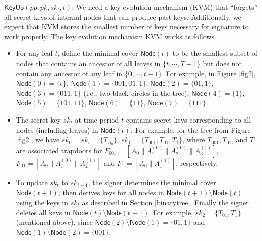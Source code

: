 \documentclass[runningheads]{llncs}
\begin{document}
\begin{description}
\item  \underline{$ \textsf{KeyUp}(pp,pk,sk_t,t)$}: 
	We need a key evolution mechanism (\textsf{KVM}) that ``forgets'' all secret keys 
	of internal nodes that can produce past keys.
	Additionally, we expect that \textsf{KVM} stores the smallest number of keys necessary for signature to work properly.
	The key evolution mechanism \textsf{KVM} works as follows.
   	\begin{itemize}
  	 \item 
   	For any leaf $t$, define the minimal cover $\textsf{Node}(t)$ to be 
	the smallest subset of nodes that contains an ancestor of all leaves in $\{t, \cdots , T-1\}$ but does not contain any
   	ancestor of any leaf in $\{0, \cdots , t-1\}$.   
   	For example, in Figure \ref{fig2}, $\textsf{Node}(0)=\{\epsilon\}$, $\textsf{Node}(1)=\{001, 01, 1\}$, 
	$\textsf{Node}(2)=\{01, 1\}$, $\textsf{Node}(3)=\{011, 1\}$ (i.e., two black circles in the tree), $\textsf{Node}(4)=\{1\}$,  
	$\textsf{Node}(5)=\{101, 11\}$, $\textsf{Node}(6)=\{ 11\}$, $\textsf{Node}(7)=\{111\}$.
	\item The secret key $sk_t$ at time period $t$ contains secret keys corresponding to all nodes 
	(including leaves) in  $\textsf{Node}(t)$. 
	For example, for the tree from Figure \ref{fig2},
	we have 
	$sk_0=sk_{\epsilon}=\{T_{A_0}\}$, $sk_1=\{T_{001}, T_{01}, T_{1} \}$, 
	where $T_{001}, T_{01}$, and $T_{1}$ are associated trapdoors for 
	$F_{001}=[A_0\|A_1^{(0)}\|A_{2}^{(0)}\|A_3^{(1)}]$, $F_{01}=[A_0\|A_1^{(0)}\|A_{2}^{(1)}]$ and $F_{1}=[A_0\|A_1^{(1)}]$, respectively.
	\item 
	To update $sk_t$ to $sk_{t+1}$, the signer determines the minimal cover $\textsf{Node}(t+1)$, 
	then derives keys for all nodes in $\textsf{Node}(t+1) \setminus \textsf{Node}(t)$ using the keys in $sk_t$ 
	as described in Section \ref{binarytree}.
	Finally the signer deletes all keys in $\textsf{Node}(t) \setminus \textsf{Node}(t+1)$. 
	For example, $sk_2=\{T_{01}, T_1\}$ (mentioned above), 
	since $\textsf{Node}(2) \setminus \textsf{Node}(1)=\{01,1\}$ and $\textsf{Node}(1) \setminus \textsf{Node}(2)=\{001\}$.
   	\end{itemize}
\begin{figure}
	\centering
{}
\end{figure}
\end{description}
\end{document}
